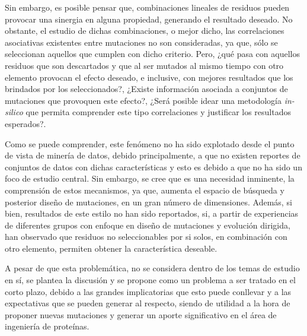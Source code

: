 Sin embargo, es posible pensar que, combinaciones lineales de residuos pueden provocar una sinergia en alguna propiedad, generando el resultado deseado. No obstante, el estudio de dichas combinaciones, o mejor dicho, las correlaciones asociativas existentes entre mutaciones no son consideradas, ya que, sólo se seleccionan aquellos que cumplen con dicho criterio. Pero, ¿qué pasa con aquellos residuos que son descartados y que al ser mutados al mismo tiempo con otro elemento provocan el efecto deseado, e inclusive, con mejores resultados que los brindados por los seleccionados?, ¿Existe información asociada a conjuntos de mutaciones que provoquen este efecto?, ¿Será posible idear una metodología \textit{in-silico} que permita comprender este tipo correlaciones y justificar los resultados esperados?.

Como se puede comprender, este fenómeno no ha sido explotado desde el punto de vista de minería de datos, debido principalmente, a que no existen reportes de conjuntos de datos con dichas características y esto es debido a que no ha sido un foco de estudio central. Sin embargo, se cree que es una necesidad inminente, la comprensión de estos mecanismos, ya que, aumenta el espacio de búsqueda y posterior diseño de mutaciones, en un gran número de dimensiones. Además, si bien, resultados de este estilo no han sido reportados, si, a partir de experiencias de diferentes grupos con enfoque en diseño de mutaciones y evolución dirigida, han observado que residuos no seleccionables por si solos, en combinación con otro elemento, permiten obtener la característica deseable.

A pesar de que esta problemática, no se considera dentro de los temas de estudio en sí, se plantea la discusión y se propone como un problema a ser tratado en el corto plazo, debido a las grandes implicatorias que esto puede conllevar y a las expectativas que se pueden generar al respecto, siendo de utilidad a la hora de proponer nuevas mutaciones y generar un aporte significativo en el área de ingeniería de proteínas.
 
